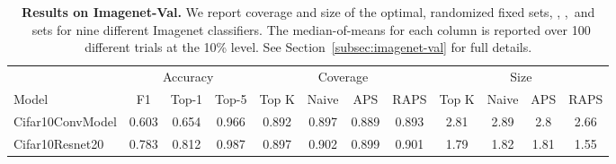 \begin{table}[t] 
\centering 
\small 
\begin{tabular}{lccccccccccc} 
\toprule 
 & \multicolumn{3}{c}{Accuracy}  & \multicolumn{4}{c}{Coverage} & \multicolumn{4}{c}{Size} \\ 
\cmidrule(r){3-4}  \cmidrule(r){5-8}  \cmidrule(r){9-12} 
Model & F1 & Top-1 & Top-5 & Top K & Naive & APS & RAPS & Top K & Naive & APS & RAPS \\ 
\midrule 
 Cifar10ConvModel &  0.603 &  0.654 &  0.966 & 0.892 & 0.897 & 0.889 & 0.893 & 2.81 & 2.89 & 2.8 & 2.66 \\ 
 Cifar10Resnet20 &  0.783 &  0.812 &  0.987 & 0.897 & 0.902 & 0.899 & 0.901 & 1.79 & 1.82 & 1.81 & 1.55 \\ 
\bottomrule 
\end{tabular} 
\caption{\textbf{Results on Imagenet-Val.} We report coverage and size of the optimal, randomized fixed sets, \naive, \aps,\ and \raps\ sets for nine different Imagenet classifiers. The median-of-means for each column is reported over 100 different trials at the 10\% level. See Section~\ref{subsec:imagenet-val} for full details.} 
\label{table:imagenet-val} 
\end{table} 
